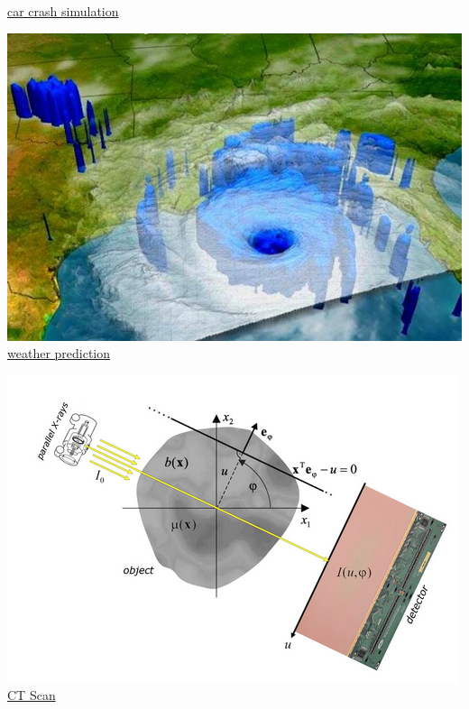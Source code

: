 \begin{frame}[c]
\begin{minipage}[t]{0.25\textwidth}
		\hyperref{https://www.emi.fraunhofer.de/en/business-units/automotive/research/Roentgen-Crashtest.html}{}{}{car crash simulation} 
	\end{minipage}
	\begin{minipage}[t]{0.25\textwidth}\centering
		\includegraphics[width=\textwidth]{media/weather.jpg}\\
		\hyperref{https://en.wikipedia.org/wiki/Numerical_weather_prediction}{}{}{weather prediction} 
	\end{minipage}
	\begin{minipage}[t]{0.25\textwidth} \centering
		\includegraphics[width=\textwidth]{media/ct_scan.png}\\
		\hyperref{https://en.wikipedia.org/wiki/CT_scan}{}{}{CT Scan} 
	\end{minipage}
\end{frame}

